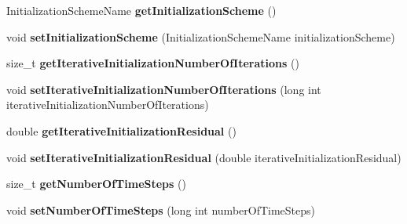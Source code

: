 \begin{DoxyCompactItemize}
\item 
\hypertarget{classnatrium_1_1SolverConfiguration_afe9fd2087df0ab6066f260bf6bfd03ac}{Initialization\-Scheme\-Name {\bfseries get\-Initialization\-Scheme} ()}\label{classnatrium_1_1SolverConfiguration_afe9fd2087df0ab6066f260bf6bfd03ac}

\item 
\hypertarget{classnatrium_1_1SolverConfiguration_a4d867b8b8c0c08fc68b95f1a1a52c95d}{void {\bfseries set\-Initialization\-Scheme} (Initialization\-Scheme\-Name initialization\-Scheme)}\label{classnatrium_1_1SolverConfiguration_a4d867b8b8c0c08fc68b95f1a1a52c95d}

\item 
\hypertarget{classnatrium_1_1SolverConfiguration_aa12123336ffa7489780baa45d99569b1}{size\-\_\-t {\bfseries get\-Iterative\-Initialization\-Number\-Of\-Iterations} ()}\label{classnatrium_1_1SolverConfiguration_aa12123336ffa7489780baa45d99569b1}

\item 
\hypertarget{classnatrium_1_1SolverConfiguration_ac4188dce03b129130f153f7028c3f79e}{void {\bfseries set\-Iterative\-Initialization\-Number\-Of\-Iterations} (long int iterative\-Initialization\-Number\-Of\-Iterations)}\label{classnatrium_1_1SolverConfiguration_ac4188dce03b129130f153f7028c3f79e}

\item 
\hypertarget{classnatrium_1_1SolverConfiguration_a966eee9da52af6fbd1f8d5fad2b8427a}{double {\bfseries get\-Iterative\-Initialization\-Residual} ()}\label{classnatrium_1_1SolverConfiguration_a966eee9da52af6fbd1f8d5fad2b8427a}

\item 
\hypertarget{classnatrium_1_1SolverConfiguration_ad9551932a38bda46c8ca2ef88a73e754}{void {\bfseries set\-Iterative\-Initialization\-Residual} (double iterative\-Initialization\-Residual)}\label{classnatrium_1_1SolverConfiguration_ad9551932a38bda46c8ca2ef88a73e754}

\item 
\hypertarget{classnatrium_1_1SolverConfiguration_a13121a202636553339d5b1f83d196fd7}{size\-\_\-t {\bfseries get\-Number\-Of\-Time\-Steps} ()}\label{classnatrium_1_1SolverConfiguration_a13121a202636553339d5b1f83d196fd7}

\item 
\hypertarget{classnatrium_1_1SolverConfiguration_a50c43893f5c6ed0d73fcccd64f523053}{void {\bfseries set\-Number\-Of\-Time\-Steps} (long int number\-Of\-Time\-Steps)}\label{classnatrium_1_1SolverConfiguration_a50c43893f5c6ed0d73fcccd64f523053}


\end{DoxyCompactItemize}
